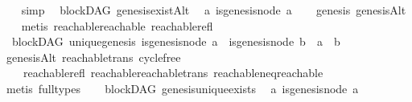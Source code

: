 \begin{isabellebody}
%
\isadelimproof
\ \ %
\endisadelimproof
%
\isatagproof
{}\isamarkupfalse%
\ simp%
\endisatagproof
{\isafoldproof}%
%
\isadelimproof
\isanewline
%
\endisadelimproof
\isanewline
{}\isamarkupfalse%
\ {\isacharparenleft}{\kern0pt}\ blockDAG{\isacharparenright}{\kern0pt}\ genesis{\isacharunderscore}{\kern0pt}existAlt{\isacharcolon}{\kern0pt}\isanewline
\ \ {\isachardoublequoteopen}{\isasymexists}a{\isachardot}{\kern0pt}\ is{\isacharunderscore}{\kern0pt}genesis{\isacharunderscore}{\kern0pt}node\ a{\isachardoublequoteclose}\isanewline
%
\isadelimproof
\ \ %
\endisadelimproof
%
\isatagproof
{}\isamarkupfalse%
\ genesis\ genesisAlt\isanewline
\ \ \isamarkupfalse%
\ {\isacharparenleft}{\kern0pt}metis\ reachable{}{\isacharunderscore}{\kern0pt}reachable\ reachable{\isacharunderscore}{\kern0pt}refl{\isacharparenright}{\kern0pt}%
\endisatagproof
{\isafoldproof}%
%
\isadelimproof
\ \ \isanewline
%
\endisadelimproof
\isanewline
{}\isamarkupfalse%
\ {\isacharparenleft}{\kern0pt}\ blockDAG{\isacharparenright}{\kern0pt}\ unique{\isacharunderscore}{\kern0pt}genesis{\isacharcolon}{\kern0pt}\ {\isachardoublequoteopen}is{\isacharunderscore}{\kern0pt}genesis{\isacharunderscore}{\kern0pt}node\ a\ {\isasymand}\ is{\isacharunderscore}{\kern0pt}genesis{\isacharunderscore}{\kern0pt}node\ b\ {\isasymlongrightarrow}\ a\ {\isacharequal}{\kern0pt}\ b{\isachardoublequoteclose}\isanewline
%
\isadelimproof
\ \ %
\endisadelimproof
%
\isatagproof
{}\isamarkupfalse%
\ genesisAlt\ reachable{\isacharunderscore}{\kern0pt}trans\ cycle{\isacharunderscore}{\kern0pt}free\isanewline
\ \ \ \ reachable{\isacharunderscore}{\kern0pt}refl\ reachable{\isacharunderscore}{\kern0pt}reachable{}{\isacharunderscore}{\kern0pt}trans\ reachable{\isacharunderscore}{\kern0pt}neq{\isacharunderscore}{\kern0pt}reachable{}\isanewline
\ \ \isamarkupfalse%
\ {\isacharparenleft}{\kern0pt}metis\ {\isacharparenleft}{\kern0pt}full{\isacharunderscore}{\kern0pt}types{\isacharparenright}{\kern0pt}{\isacharparenright}{\kern0pt}%
\endisatagproof
{\isafoldproof}%
%
\isadelimproof
\ \isanewline
%
\endisadelimproof
\isanewline
{}\isamarkupfalse%
\ {\isacharparenleft}{\kern0pt}\ blockDAG{\isacharparenright}{\kern0pt}\ genesis{\isacharunderscore}{\kern0pt}unique{\isacharunderscore}{\kern0pt}exists{\isacharcolon}{\kern0pt}\isanewline
\ \ {\isachardoublequoteopen}{\isasymexists}{\isacharbang}{\kern0pt}a{\isachardot}{\kern0pt}\ is{\isacharunderscore}{\kern0pt}genesis{\isacharunderscore}{\kern0pt}node\ a{\isachardoublequoteclose}\isanewline

\end{isabellebody}
